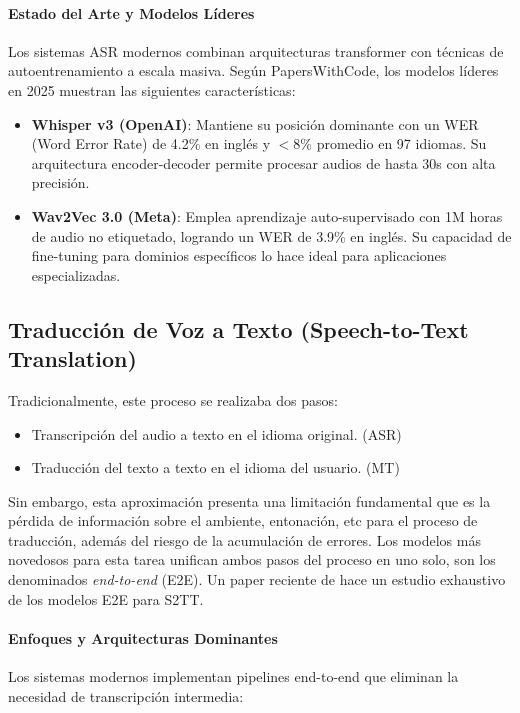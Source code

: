 \paragraph{Estado del Arte y Modelos Líderes}
Los sistemas ASR modernos combinan arquitecturas transformer con técnicas de autoentrenamiento a escala masiva. Según PapersWithCode, los modelos líderes en 2025 muestran las siguientes características:

\begin{itemize}
    \item \textbf{Whisper v3 (OpenAI)}: Mantiene su posición dominante con un WER (Word Error Rate) de 4.2\% en inglés y $<$8\% promedio en 97 idiomas\cite{statcounter2025}. Su arquitectura encoder-decoder permite procesar audios de hasta 30s con alta precisión.
    \item \textbf{Wav2Vec 3.0 (Meta)}: Emplea aprendizaje auto-supervisado con 1M horas de audio no etiquetado, logrando un WER de 3.9\% en inglés\cite{jia2022cvss}. Su capacidad de fine-tuning para dominios específicos lo hace ideal para aplicaciones especializadas.
\end{itemize}

\subsection{Traducción de Voz a Texto (Speech-to-Text Translation)}
Tradicionalmente, este proceso se realizaba dos pasos:
\begin{itemize}
    \item Transcripción del audio a texto en el idioma original. (ASR)
    \item Traducción del texto a texto en el idioma del usuario. (MT)
\end{itemize}
Sin embargo, esta aproximación presenta una limitación fundamental que es la pérdida de información sobre el ambiente, entonación, etc para el proceso de traducción, además del riesgo de la acumulación de errores.
Los modelos más novedosos para esta tarea unifican ambos pasos del proceso en uno solo, son los denominados \textit{end-to-end} (E2E). Un paper reciente de \cite{SETHIYA2025101751} hace un estudio exhaustivo de los modelos E2E para S2TT.





\paragraph{Enfoques y Arquitecturas Dominantes}
Los sistemas modernos implementan pipelines end-to-end que eliminan la necesidad de transcripción intermedia:

